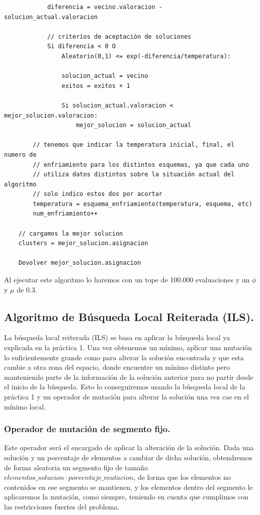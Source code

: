 \documentclass[12pt, spanish]{article}
\begin{document}
\begin{lstlisting}
			diferencia = vecino.valoracion - solucion_actual.valoracion
			
			// criterios de aceptación de soluciones
			Si diferencia < 0 O
				Aleatorio(0,1) <= exp(-diferencia/temperatura):
				
				solucion_actual = vecino
				exitos = exitos + 1
				
				Si solucion_actual.valoracion < mejor_solucion.valoracion:
					mejor_solucion = solucion_actual
		
		// tenemos que indicar la temperatura inicial, final, el numero de 
		// enfriamiento para los distintos esquemas, ya que cada uno
		// utiliza datos distintos sobre la situación actual del algoritmo
		// solo indico estos dos por acortar
		temperatura = esquema_enfriamiento(temperatura, esquema, etc)
		num_enfriamiento++
		
	// cargamos la mejor solucion
	clusters = mejor_solucion.asignacion
	
	Devolver mejor_solucion.asignacion
\end{lstlisting}

Al ejecutar este algoritmo lo haremos con un tope de 100.000 evaluaciones y un $\phi$ y $\mu$ de 0.3.

\subsection{Algoritmo de Búsqueda Local Reiterada (ILS).}

La búsqueda local reiterada (ILS) se basa en aplicar la búsqueda local ya explicada en la práctica 1. Una vez obtenemos un mínimo, aplicar una mutación lo suficientemente grande como para alterar la solución encontrada y que esta cambie a otra zona del espacio, donde encuentre un mínimo distinto pero manteniendo parte de la información de la solución anterior para no partir desde el inicio de la búsqueda. Esto lo conseguiremos usando la búsqueda local de la práctica 1 y un operador de mutación para alterar la solución una vez cae en el mínimo local.

\subsubsection{Operador de mutación de segmento fijo.}

Este operador será el encargado de aplicar la alteración de la solución. Dada una solución y un porcentaje de elementos a cambiar de dicha solución, obtendremos de forma aleatoria un segmento fijo de tamaño $elementos\_solucion \cdot porcentaje\_mutacion$, de forma que los elementos no contenidos en ese segmento se mantienen, y los elementos dentro del segmento le aplicaremos la mutación, como siempre, teniendo en cuenta que cumplimos con las restricciones fuertes del problema.
\end{document}

